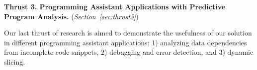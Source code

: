 \vspace{3pt}
\noindent \textbf{Thrust 3. Programming Assistant Applications with Predictive Program Analysis.}  ({\em Section~\ref{sec:thrust3}})


Our last thrust of research is aimed to demonstrate the usefulness of
our solution in different programming assistant applications: 1)
analyzing data dependencies from incomplete code snippets, 2)
debugging and error detection, and 3) dynamic slicing.











